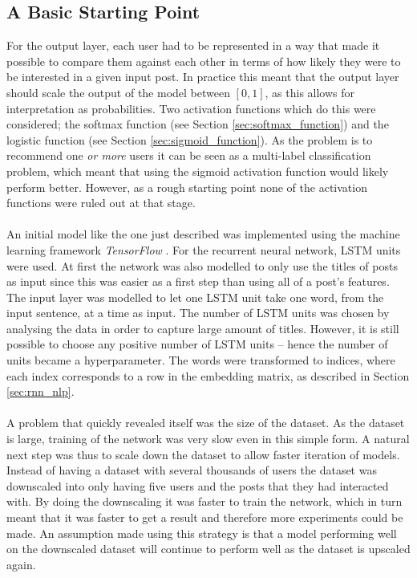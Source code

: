\subsection{A Basic Starting Point}\label{method_basic_start_point}
For the output layer, each user had to be represented in a way that made it possible to compare them against each other in terms of how likely they were to be interested in a given input post. In practice this meant that the output layer should scale the output of the model between $[0,1]$, as this allows for interpretation as probabilities. Two activation functions which do this were considered; the softmax function (see Section \ref{sec:softmax_function}) and the logistic function (see Section \ref{sec:sigmoid_function}). As the problem is to recommend one \textit{or more} users it can be seen as a multi-label classification problem, which meant that using the sigmoid activation function would likely perform better. However, as a rough starting point none of the activation functions were ruled out at that stage.
\\\\
An initial model like the one just described was implemented using the machine learning framework \textit{TensorFlow} \parencite{tensorflow2015whitepaper}. For the recurrent neural network, LSTM units were used. At first the network was also modelled to only use the titles of posts as input since this was easier as a first step than using all of a post's features. The input layer was modelled to let one LSTM unit take one word, from the input sentence, at a time as input. The number of LSTM units was chosen by analysing the data in order to capture large amount of titles. However, it is still possible to choose any positive number of LSTM units -- hence the number of units became a hyperparameter. The words were transformed to indices, where each index corresponds to a row in the embedding matrix, as described in Section \ref{sec:rnn_nlp}.
\\\\
A problem that quickly revealed itself was the size of the dataset. As the dataset is large, training of the network was very slow even in this simple form. A natural next step was thus to scale down the dataset to allow faster iteration of models. Instead of having a dataset with several thousands of users the dataset was downscaled into only having five users and the posts that they had interacted with. By doing the downscaling it was faster to train the network, which in turn meant that it was faster to get a result and therefore more experiments could be made. An assumption made using this strategy is that a model performing well on the downscaled dataset will continue to perform well as the dataset is upscaled again. 
